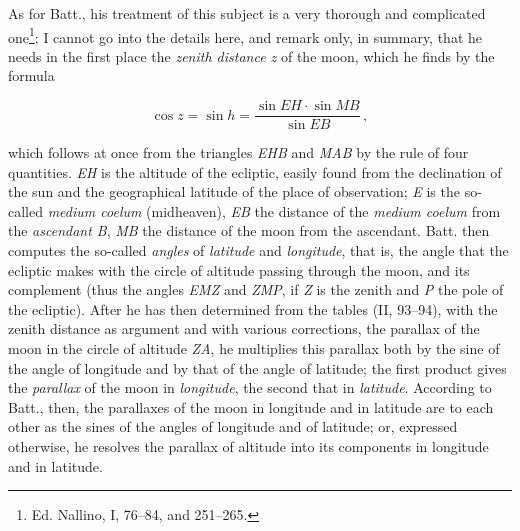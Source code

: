 \documentclass[11pt]{article}
\newcommand{\Pg}[1]{\marginpar{\footnotesize\color{gray}#1}}
\begin{document}
\par As for Batt., his treatment of this subject is a very thorough and complicated one\footnote{Ed. Nallino, I, 76–84, and 251–265.}; I cannot go into the details here, and remark only, in summary, that he needs in the first place the \emph{zenith distance z} of the moon, which he finds by the formula\par
\par\smallskip\[\cos z = \sin h = \frac{\sin EH\cdot\sin MB}{\sin EB}\,,\]\par\smallskip
\par which follows at once from the triangles \emph{EHB} and \emph{MAB} by the rule of four quantities. \emph{EH} is the altitude of the ecliptic, easily found from the declination of the sun and the geographical latitude of the place of observation; \emph{E} is the so-called \emph{medium coelum} (midheaven), \emph{EB} the distance of the \emph{medium coelum} from the \emph{ascendant B}, \emph{MB} the distance of the moon from the ascendant. Batt. then computes the so-called \emph{angles} of \emph{latitude} and \emph{longitude}, that is, the angle that the ecliptic makes with the circle of altitude passing through the moon, and its complement (thus the angles \emph{EMZ} and \emph{ZMP}, if \emph{Z} is the zenith and \emph{P} the pole of the \Pg{92}ecliptic). After he has then determined from the tables (II, 93–94), with the zenith distance as argument and with various corrections, the parallax of the moon in the circle of altitude \emph{ZA}, he multiplies this parallax both by the sine of the angle of longitude and by that of the angle of latitude; the first product gives the \emph{parallax} of the moon in \emph{longitude}, the second that in \emph{latitude}. According to Batt., then, the parallaxes of the moon in longitude and in latitude are to each other as the sines of the angles of longitude and of latitude; or, expressed otherwise, he resolves the parallax of altitude into its components in longitude and in latitude.\par
\end{document}

